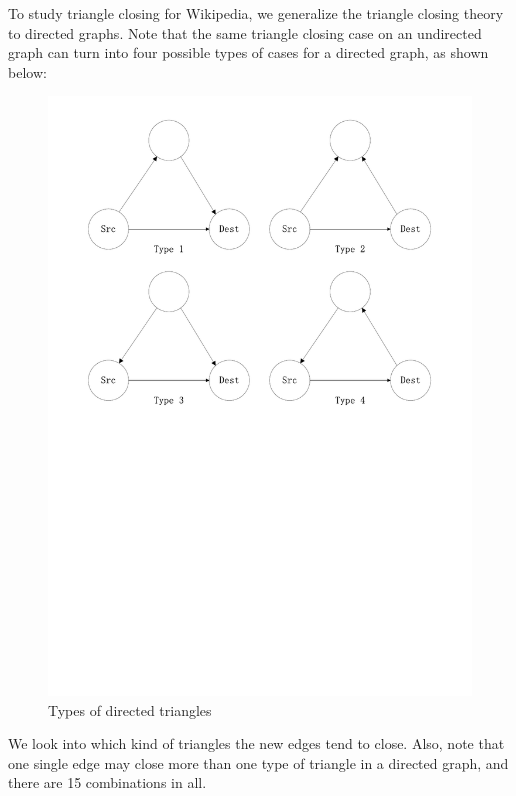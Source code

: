 \documentclass[10pt,twocolumn]{article}
\begin{document}
To study triangle closing for Wikipedia, we generalize the triangle closing theory to directed graphs. Note that the same triangle closing case on an undirected graph can turn into four possible types of cases for a directed graph, as shown below: 
\begin{figure}[ht]
    \centering
        \includegraphics[scale = 0.35, trim = 2cm 14cm 2cm 1cm]{./graphs/triangles.pdf}
    \caption{Types of directed triangles} \label{fig:triangles}
\end{figure}
We look into which kind of triangles the new edges tend to close. Also, note that one single edge may close more than one type of triangle in a directed graph, and there are 15 combinations in all. 
\end{document}
